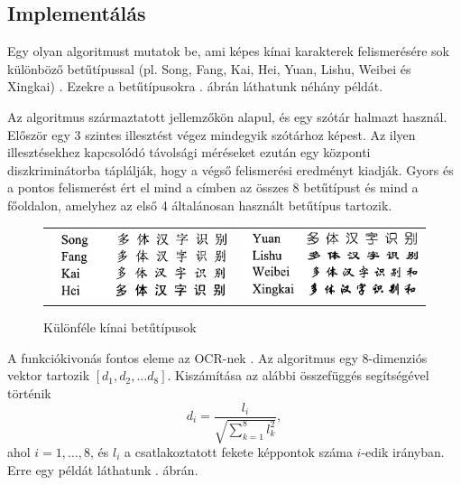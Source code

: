 \subsection{Implementálás}

Egy olyan algoritmust mutatok be, ami képes kínai karakterek felismerésére sok különböző betűtípussal (pl. Song, Fang, Kai, Hei, Yuan, Lishu, Weibei és Xingkai) \cite{wu2002recognition}. Ezekre a betűtípusokra . ábrán láthatunk néhány példát.

Az algoritmus származtatott jellemzőkön alapul, és egy szótár halmazt használ. Először egy 3 szintes illesztést végez mindegyik szótárhoz képest. Az ilyen illesztésekhez kapcsolódó távolsági méréseket ezután egy központi diszkriminátorba táplálják, hogy a végső felismerési eredményt kiadják. Gyors és a pontos felismerést ért el mind a címben az összes 8 betűtípust és mind a főoldalon, amelyhez az első 4 általánosan használt betűtípus tartozik.

\begin{figure}[h]
\centering
\begin{tabular}{ c c }
\includegraphics[scale=0.35]{images/chinese_fonts1} & \includegraphics[scale=0.35]{images/chinese_fonts2}
\end{tabular}
\caption{Különféle kínai betűtípusok}
\label{fig:chinese_fonts}
\end{figure}

A funkciókivonás fontos eleme az OCR-nek \cite{wu2002recognition}. Az algoritmus egy 8-dimenziós vektor tartozik $[d_1, d_2, \ldots d_8]$. Kiszámítása az alábbi összefüggés segítségével történik
$$
d_i = \dfrac{l_i}{\sqrt{\displaystyle \sum_{k=1}^8 l_k^2}},
$$
ahol $i = 1, \ldots, 8$, és $l_i$ a csatlakoztatott fekete képpontok száma $i$-edik irányban. Erre egy példát láthatunk . ábrán.

